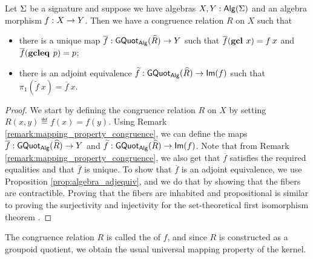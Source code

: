 \begin{theorem}\label{thm:iso_thm}
Let $\Sigma$ be a signature and suppose we have algebras $X, Y : \mathsf{Alg}(\Sigma)$ and an algebra morphism $f : X \rightarrow Y$.
Then we have a congruence relation $R$ on $X$ such that
\begin{itemize}
	\item there is a unique map $\overline{f} : \mathsf{GQuot}_{\mathsf{Alg}}(\widehat{R}) \rightarrow Y$ such that $\overline{f}(\operatorname{\mathbf{gcl}} \> x) = f \> x$ and $\overline{f}(\operatorname{\mathbf{gcleq}} \> p) = p$;
	\item there is an adjoint equivalence $\widetilde{f} : \mathsf{GQuot}_{\mathsf{Alg}}(\widehat{R}) \rightarrow \mathsf{Im}(f)$ such that $\pi_1(\widetilde{f} \> x) = \overline{f} \> x$.
\end{itemize}
\end{theorem}

\begin{proof}
We start by defining the congruence relation $R$ on $X$ by setting $R(x, y) \eqdef f(x) = f(y)$.
Using Remark \ref{remark:mapping_property_congruence}, we can define the maps $\overline{f} : \mathsf{GQuot}_{\mathsf{Alg}}(\widehat{R}) \rightarrow Y$ and $\widetilde{f} : \mathsf{GQuot}_{\mathsf{Alg}}(\widehat{R}) \rightarrow \mathsf{Im}(f)$.
Note that from Remark \ref{remark:mapping_property_congruence}, we also get that $\overline{f}$ satisfies the required equalities and that $\overline{f}$ is unique.
To show that $\overline{f}$ is an adjoint equivalence, we use Proposition \ref{prop:algebra_adjequiv}, and we do that by showing that the fibers are contractible.
Proving that the fibers are inhabited and propositional is similar to proving the surjectivity and injectivity for the set-theoretical first isomorphism theorem \cite{lynge2019}.
\end{proof}

The congruence relation $R$ is called the  of $f$, and since $R$ is constructed as a groupoid quotient, we obtain the usual universal mapping property of the kernel.

